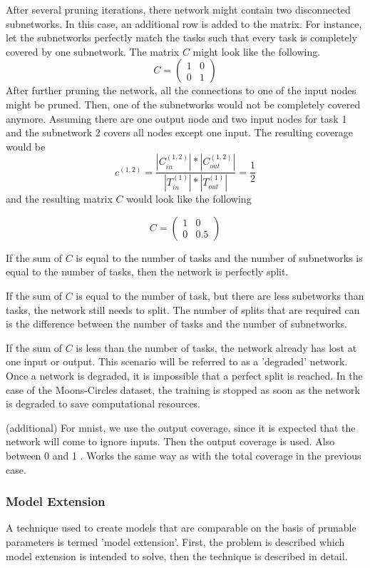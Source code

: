 After several pruning iterations, there network might contain two disconnected subnetworks.
In this case, an additional row is added to the matrix.
For instance, let the subnetworks perfectly match the tasks such that every task is completely covered by one subnetwork.
The matrix $C$ might look like the following.
$$
C = \begin{pmatrix}
    1 & 0 \\ 0 & 1
\end{pmatrix}
$$
After further pruning the network, all the connections to one of the input nodes might be pruned.
Then, one of the subnetworks would not be completely covered anymore.
Assuming there are one output node and two input nodes for task 1 and the subnetwork 2 covers all nodes except one input.
The resulting coverage would be 
$$
c^{(1,2)} =  \frac{
    | C^{(1,2)}_{in}| * | C^{(1,2)}_{out} |
    }{
    |T^{(1)}_{in}| * |T^{(1)}_{out}|
} = \frac{1}{2}
$$
and the resulting matrix $C$ would look like the following

$$
C = \begin{pmatrix}
    1 & 0 \\ 0 & 0.5
\end{pmatrix}
$$

If the sum of $C$ is equal to the number of tasks and the number of subnetworks is equal to the number of tasks, then the network is perfectly split.

If the sum of $C$ is equal to the number of task, but there are less subetworks than tasks, the network still needs to split.
The number of splits that are required can is the difference between the number of tasks and the number of subnetworks.

If the sum of $C$ is less than the number of tasks, the network already has lost at one input or output.
This scenario will be referred to as a 'degraded' network.
Once a network is degraded, it is impossible that a perfect split is reached.
In the case of the Moons-Circles dataset, the training is stopped as soon as the network is degraded to save computational resources.

(additional)
For mnist, we use the output coverage, since it is expected that the network will come to ignore inputs.
Then the output coverage is used. Also between 0 and 1 . Works the same way as with the total coverage in the previous case.

\subsubsection{Model Extension}
A technique used to create models that are comparable on the basis of prunable parameters is termed 'model extension'. First, the problem is described which model extension is intended to solve, then the technique is described in detail.

